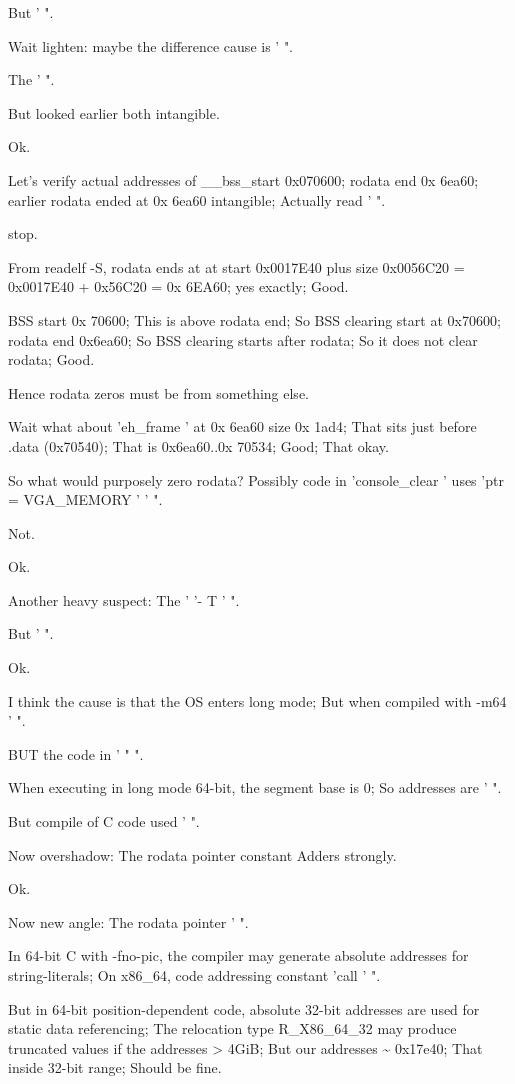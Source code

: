 \begin{decodedreasoningpanel}
But ' ".

Wait lighten: maybe the difference cause is ' ".

The ' ".

But looked earlier both intangible.

Ok.

Let's verify actual addresses of \_\_bss\_start 0x070600; rodata end 0x 6ea60; earlier rodata ended at 0x 6ea60 intangible; Actually read ' ".

stop.

From readelf -S, rodata ends at at start 0x0017E40 plus size 0x0056C20 = 0x0017E40 + 0x56C20 = 0x 6EA60; yes exactly; Good.

BSS start 0x 70600; This is above rodata end; So BSS clearing start at 0x70600; rodata end 0x6ea60; So BSS clearing starts after rodata; So it does not clear rodata; Good.

Hence rodata zeros must be from something else.

Wait what about 'eh\_frame ' at 0x 6ea60 size 0x 1ad4; That sits just before .data (0x70540); That is 0x6ea60..0x 70534; Good; That okay.

So what would purposely zero rodata? Possibly code in 'console\_clear ' uses 'ptr = VGA\_MEMORY ' ' ".

Not.

Ok.

Another heavy suspect: The ' '- T ' ".

But ' ".

Ok.

I think the cause is that the OS enters long mode; But when compiled with -m64 ' ".

BUT the code in ' " ".

When executing in long mode 64-bit, the segment base is 0; So addresses are ' ".

But compile of C code used ' ".

Now overshadow: The rodata pointer constant Adders strongly.

Ok.

Now new angle: The rodata pointer ' ".

In 64-bit C with -fno-pic, the compiler may generate absolute addresses for string-literals; On x86\_64, code addressing constant 'call ' ".

But in 64-bit position-dependent code, absolute 32-bit addresses are used for static data referencing; The relocation type R\_X86\_64\_32 may produce truncated values if the addresses > 4GiB; But our addresses \textasciitilde{} 0x17e40; That inside 32-bit range; Should be fine.


\end{decodedreasoningpanel}
